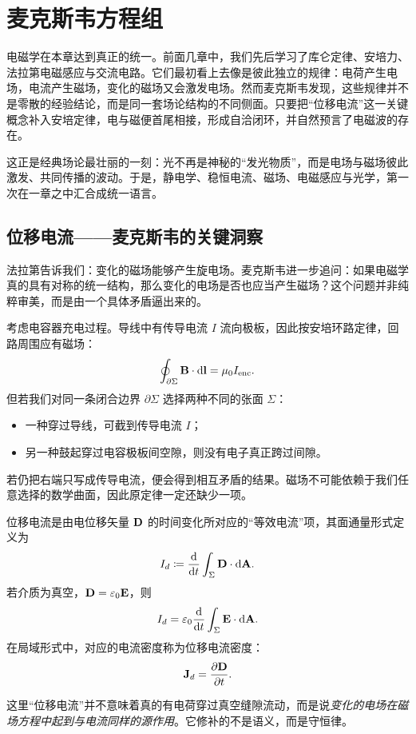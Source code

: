 \chapter{麦克斯韦方程组}

电磁学在本章达到真正的统一。前面几章中，我们先后学习了库仑定律、安培力、法拉第电磁感应与交流电路。它们最初看上去像是彼此独立的规律：电荷产生电场，电流产生磁场，变化的磁场又会激发电场。然而麦克斯韦发现，这些规律并不是零散的经验结论，而是同一套场论结构的不同侧面。只要把“位移电流”这一关键概念补入安培定律，电与磁便首尾相接，形成自洽闭环，并自然预言了电磁波的存在。

这正是经典场论最壮丽的一刻：光不再是神秘的“发光物质”，而是电场与磁场彼此激发、共同传播的波动。于是，静电学、稳恒电流、磁场、电磁感应与光学，第一次在一章之中汇合成统一语言。

\section{位移电流——麦克斯韦的关键洞察}

法拉第告诉我们：变化的磁场能够产生旋电场。麦克斯韦进一步追问：如果电磁学真的具有对称的统一结构，那么变化的电场是否也应当产生磁场？这个问题并非纯粹审美，而是由一个具体矛盾逼出来的。

考虑电容器充电过程。导线中有传导电流 $I$ 流向极板，因此按安培环路定律，回路周围应有磁场：
\[
\oint_{\partial \Sigma} \vb{B}\cdot \dd \vb{l}=\mu_0 I_{\text{enc}}.
\]
但若我们对同一条闭合边界 $\partial \Sigma$ 选择两种不同的张面 $\Sigma$：
\begin{itemize}
  \item 一种穿过导线，可截到传导电流 $I$；
  \item 另一种鼓起穿过电容极板间空隙，则没有电子真正跨过间隙。
\end{itemize}
若仍把右端只写成传导电流，便会得到相互矛盾的结果。磁场不可能依赖于我们任意选择的数学曲面，因此原定律一定还缺少一项。

\begin{definition}[位移电流]
位移电流是由电位移矢量 $\vb{D}$ 的时间变化所对应的“等效电流”项，其面通量形式定义为
\[
I_d\coloneqq \dv{}{t}\int_{\Sigma} \vb{D}\cdot \dd \vb{A}.
\]
若介质为真空，$\vb{D}=\varepsilon_0\vb{E}$，则
\[
I_d=\varepsilon_0\dv{}{t}\int_{\Sigma} \vb{E}\cdot \dd \vb{A}.
\]
在局域形式中，对应的电流密度称为位移电流密度：
\[
\vb{J}_d=\pdv{\vb{D}}{t}.
\]
\end{definition}

这里“位移电流”并不意味着真的有电荷穿过真空缝隙流动，而是说\emph{变化的电场在磁场方程中起到与电流同样的源作用}。它修补的不是语义，而是守恒律。

